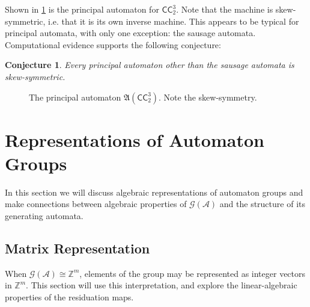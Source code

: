 \documentclass[12pt, letterpaper]{article}
\newcommand{\Z}{\mathbb Z}
\newcommand{\A}{\mathcal A}
\newcommand{\CC}{\mathsf{CC}}
\newcommand{\princ}{\mathfrak A}
\newcommand{\gp}{\mathcal G}
\newtheorem{conj}[thm]{Conjecture}
\begin{document}
Shown in \cref{fig:princ-ccc-3-2} is the principal automaton for $\CC^3_2$.
Note that the machine is skew-symmetric, i.e. that it is its own inverse
machine. This appears to be typical for principal automata, with only one
exception: the sausage automata. Computational evidence supports the
following conjecture:
\begin{conj}\label{conj:skew-symmetry}
    Every principal automaton other than the sausage automata is
    skew-symmetric.
\end{conj}

\begin{figure}[h]
    \centering
    \caption{The principal automaton $\princ(\CC^3_2)$. Note the skew-symmetry.
    }
    \label{fig:princ-ccc-3-2}
\end{figure}


\pagebreak
\section{Representations of Automaton Groups}\label{sec:alg-num-theory}
In this section we will discuss algebraic representations of automaton groups
and make connections between algebraic properties of $\gp(\A)$ and the
structure of its generating automata.

\subsection{Matrix Representation}\label{sec:matrix_rep}
When $\gp(\A) \cong \Z^m$, elements of the group may be represented as integer
vectors in $\Z^m$. This section will use this interpretation, and explore the
linear-algebraic properties of the residuation maps.
\end{document}
